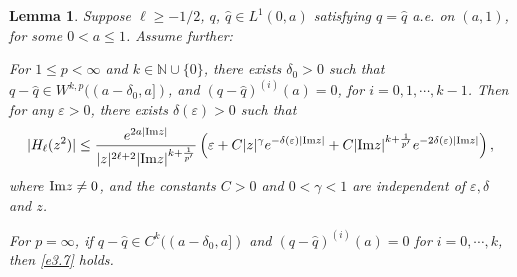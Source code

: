 \documentclass[reqno,12pt,centertags]{amsart}
\numberwithin{equation}{section}
\newtheorem{lemma}[theorem]{Lemma}
\theoremstyle{definition}
\begin{document}
\begin{lemma}\label{l3.6}
Suppose $\ell\geq-1/2$, $q$, $\hat{q}\in L^{1}(0, a)$ satisfying $q=\hat{q}$ a.e. on $(a, 1)$, for some $0<a\leq1$. Assume further: 

For $1\leq p<\infty$ and $k\in\mathbb{N}\cup\{0\}$, there exists $\delta_0>0$ such that $q-\hat{q}\in W^{k,p}((a-\delta_0, a])$, and
$(q-\hat{q})^{(i)}(a)=0$, for $i=0,1, \cdots, k-1$.
Then for any $\varepsilon>0$, there exists $\delta(\varepsilon)>0$ such that
\begin{equation}\label{e3.7}
|H_{\ell}(z^2)| 
\leq \frac{e^{2a|\textnormal{Im}z|}}
{|z|^{2\ell+2}|\textnormal{Im}z|^{k+\frac{1}{p^{\prime}}}}
\left(\varepsilon
+C|z|^{\gamma}e^{-\delta(\varepsilon)|\textnormal{Im}z|}
+C|\textnormal{Im}z|^{k+\frac{1}{p^{\prime}}}
e^{-2\delta(\varepsilon)|\textnormal{Im}z|}\right), 
\end{equation}
where $\textnormal{Im}z \neq 0$,
and the constants $C>0$ and $0<\gamma<1$ are independent of $\varepsilon, \delta$ and $z$.

For $p=\infty$, if $q-\hat{q} \in C^{k}((a-\delta_0, a])$ and $(q-\hat{q})^{(i)}(a)=0$ for $i=0, \cdots, k$, then \eqref{e3.7} holds.
\end{lemma}
\end{document}
